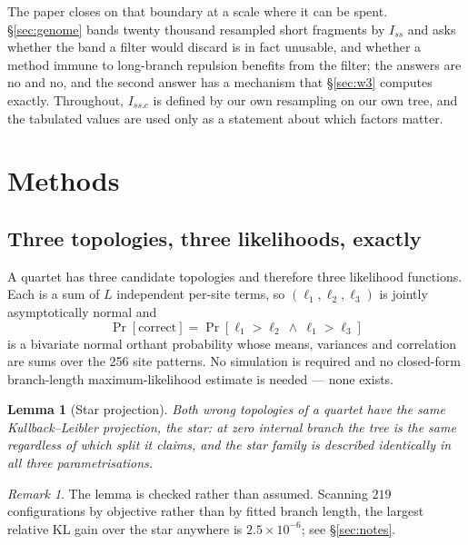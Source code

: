 \documentclass[preprint,12pt,authoryear]{elsarticle}
\newcommand{\Iss}{I_{ss}}
\newcommand{\Issc}{I_{ss.c}}
\newtheorem{lemma}[theorem]{Lemma}
\theoremstyle{definition}
\theoremstyle{remark}
\newtheorem{remark}[theorem]{Remark}
\begin{document}
The paper closes on that boundary at a scale where it can be spent.
\S\ref{sec:genome} bands twenty thousand resampled short fragments by $\Iss$
and asks whether the band a filter would discard is in fact unusable, and
whether a method immune to long-branch repulsion benefits from the filter;
the answers are no and no, and the second answer has a mechanism that
\S\ref{sec:w3} computes exactly. Throughout, $\Issc$ is defined by our own
resampling on our own tree, and the tabulated values are used only as a
statement about which factors matter.

\section{Methods}
\label{sec:methods}

\subsection{Three topologies, three likelihoods, exactly}
\label{sec:quartet}

A quartet has three candidate topologies and therefore three likelihood
functions. Each is a sum of $L$ independent per-site terms, so
$(\ell_1,\ell_2,\ell_3)$ is jointly asymptotically normal and
\begin{equation}
\Pr[\text{correct}]=\Pr[\ell_1>\ell_2\ \wedge\ \ell_1>\ell_3]
\end{equation}
is a bivariate normal orthant probability whose means, variances and
correlation are sums over the 256 site patterns. No simulation is required
and no closed-form branch-length maximum-likelihood estimate is needed ---
none exists.

\begin{lemma}[Star projection]
\label{lem:star}
Both wrong topologies of a quartet have the same Kullback--Leibler projection,
the \emph{star}: at zero internal branch the tree is the same regardless of
which split it claims, and the star family is described identically in all
three parametrisations.
\end{lemma}

\begin{remark}
The lemma is checked rather than assumed. Scanning $219$ configurations by
objective rather than by fitted branch length, the largest relative KL gain
over the star anywhere is $2.5\times10^{-6}$; see \S\ref{sec:notes}.
\end{remark}
\end{document}
